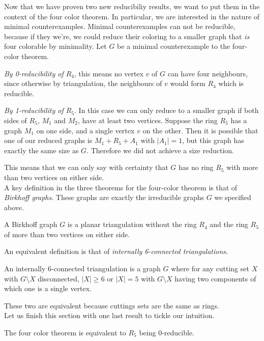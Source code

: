 Now that we have proven two new reducibiliy results, we want to put them in the context of the four color theorem. In particular, we are interested in the nature of minimal counterexamples. Minimal counterexamples can not be reducible, because if they we're, we could reduce their coloring to a smaller graph that \emph{is} four colorable by minimality. Let $G$ be a minimal counterexample to the four-color theorem.

\emph{By 0-reducibility of $R_4$}, this means no vertex $v$ of $G$ can have four neighbours, since otherwise by triangulation, the neighbours of $v$ would form $R_4$ which is reducible.

\emph{By 1-reducibility of $R_5$}. In this case we can only reduce to a smaller graph if both sides of $R_5$, $M_1$ and $M_2$, have at least two vertices. Suppose the ring $R_5$ has a graph $M_1$ on one side, and a single vertex $v$ on the other. Then it is possible that one of our reduced graphs is $M_1 + R_5 + A_1$ with $|A_1|=1$, but this graph has exactly the same size as $G$. Therefore we did not achieve a size reduction. 

This means that we can only say with certainty that $G$ has no ring $R_5$ with more than two vertices on either side.
\\
A key definition in the three theorems for the four-color theorem is that of \emph{Birkhoff graphs}. These graphs are exactly the irreducible graphs $G$ we specified above.

\begin{definition}
    A Birkhoff graph $G$ is a planar triangulation without the ring $R_4$ and the ring $R_5$ of more than two vertices on either side.
\end{definition}

An equivalent definition is that of \emph{internally 6-connected triangulations}.

\begin{definition}
    An internally 6-connected triangulation is a graph $G$ where for any cutting set $X$ with $G\setminus X$ disconnected, $|X| \geq 6$ or $|X|=5$ with $G\setminus X$ having two components of which one is a single vertex.
\end{definition}

These two are equivalent because cuttings sets are the same as rings.
\\
Let us finish this section with one last result to tickle our intuition.

\begin{theorem}
    The four color theorem is equivalent to $R_5$ being 0-reducible.
\end{theorem}

